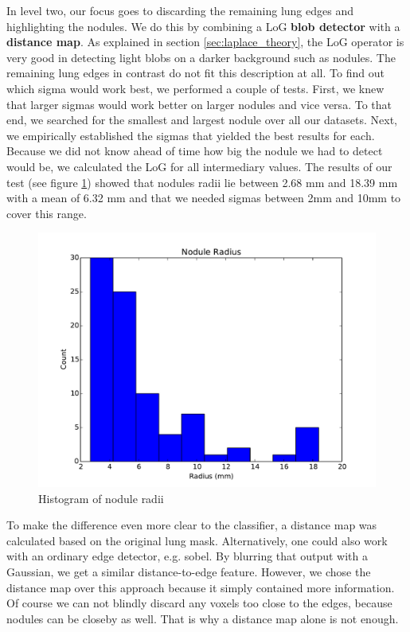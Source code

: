 In level two, our focus goes to discarding the remaining lung edges and
highlighting the nodules. We do this by combining a LoG \textbf{blob detector}
with a \textbf{distance map}. As explained in section \ref{sec:laplace_theory},
the LoG operator is very good in detecting light blobs on a darker background
such as nodules. The remaining lung edges in contrast do not fit this
description at all. To find out which sigma would work best, we performed a
couple of tests. First, we knew that larger sigmas would work better on larger
nodules and vice versa. To that end, we searched for the smallest and largest nodule
over all our datasets. Next, we empirically established the sigmas that yielded
the best results for each. Because we did not know ahead of time how big the
nodule we had to detect would be, we calculated the LoG for all intermediary
values. The results of our test (see figure \ref{fig:radii}) showed that nodules
radii lie between 2.68 mm and 18.39 mm with a mean of 6.32 mm and that
we needed sigmas between 2mm and 10mm to cover this range.

\begin{figure}[ht]
\begin{center}
  \includegraphics[width=\linewidth]{img/MaxNoduleRadii.pdf}
  \caption{Histogram of nodule radii}
  \label{fig:radii}
\end{center}
\end{figure}

To make the difference even more clear to the classifier, a distance map was
calculated based on the original lung mask. Alternatively, one could also work
with an ordinary edge detector, e.g. sobel. By blurring that output with a
Gaussian, we get a similar distance-to-edge feature. However, we chose the
distance map over this approach because it simply contained more information. Of
course we can not blindly discard any voxels too close to the edges, because
nodules can be closeby as well. That is why a distance map alone is not enough.

